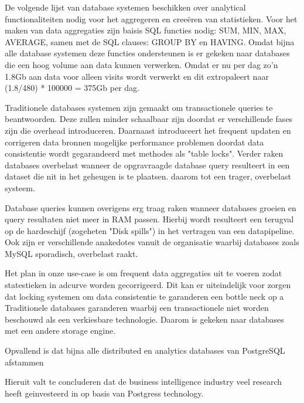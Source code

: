 
De volgende lijst van database systemen beschikken over analytical functionaliteiten nodig voor het aggregeren en creeëren van statistieken. Voor het maken van data aggregaties zijn baisis SQL functies nodig: SUM, MIN, MAX, AVERAGE, samen met de SQL clauses: GROUP BY en HAVING. \parencite{data-mining} Omdat bijna alle database systemen deze functies ondersteunen is er gekeken naar databases die een hoog volume aan data kunnen verwerken. 
Omdat er nu per dag zo'n 1.8Gb aan data voor alleen visits wordt verwerkt en dit extropaleert naar (1.8/480) * 100000 = 375Gb per dag.

Traditionele databases systemen zijn gemaakt om transactionele queries te beantwoorden. Deze zullen minder schaalbaar zijn doordat er verschillende fases zijn die overhead introduceren. \parencite{harizopoulos2008oltp}
Daarnaast introduceert het frequent updaten en corrigeren data bronnen mogelijke performance problemen doordat data consistentie wordt gegarandeerd met methodes als "table locks". Verder raken databases overbelast wanneer de opgravraagde database query resulteert in een dataset die nit in het geheugen is te plaatsen.  daarom tot een trager, overbelast systeem. \parencite{kersten2011researcher}

Database queries kunnen overigens erg traag raken wanneer databases groeien en query resultaten niet meer in RAM passen. Hierbij wordt resulteert een terugval op de hardeschijf (zogeheten "Disk spills") in het vertragen van een datapipeline. Ook zijn er verschillende anakedotes vanuit de organisatie waarbij databases zoals MySQL sporadisch, overbelast raakt.



Het plan in onze use-case is om frequent data aggregaties uit te voeren zodat statestieken in adcurve worden gecorrigeerd. Dit kan er uiteindelijk voor zorgen dat locking systemen om data consistentie te garanderen een bottle neck op a 
Traditionele databases garanderen waarbij een transactionele niet worden beschouwd als een verkiesbare technologie. Daarom is gekeken naar databases met een andere storage engine.

Opvallend is dat bijna alle distributed en analytics databases van PostgreSQL afstammen \parencite{postgresforks}

Hieruit valt te concluderen dat de business intelligence industry veel research heeft geinvesteerd in op basis van Postgress technology.

